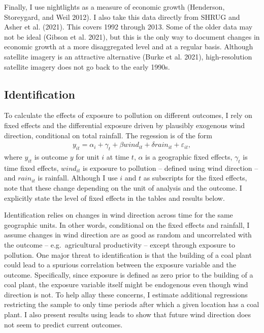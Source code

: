 \documentclass[
]{article}
\begin{document}
Finally, I use nightlights as a measure of economic growth (Henderson, Storeygard, and Weil 2012). I also take this data directly from SHRUG and Asher et al. (2021). This covers 1992 through 2013. Some of the older data may not be ideal (Gibson et al. 2021), but this is the only way to document changes in economic growth at a more disaggregated level and at a regular basis. Although satellite imagery is an attractive alternative (Burke et al. 2021), high-resolution satellite imagery does not go back to the early 1990s.

\hypertarget{identification}{%
\subsection{Identification}\label{identification}}

To calculate the effects of exposure to pollution on different outcomes, I rely on fixed effects and the differential exposure driven by plausibly exogenous wind direction, conditional on total rainfall. The regession is of the form
\begin{gather} y_{it} = \alpha_{i} + \gamma_{t} + \beta wind_{it} + \delta rain_{it} + \varepsilon_{it}, \end{gather}
where \(y_{it}\) is outcome \(y\) for unit \(i\) at time \(t\), \(\alpha\) is a geographic fixed effects, \(\gamma_t\) is time fixed effects, \(wind_{it}\) is exposure to pollution -- defined using wind direction -- and \(rain_{it}\) is rainfall. Although I use \(i\) and \(t\) as subscripts for the fixed effects, note that these change depending on the unit of analysis and the outcome. I explicitly state the level of fixed effects in the tables and results below.

Identification relies on changes in wind direction across time for the same geographic units. In other words, conditional on the fixed effects and rainfall, I assume changes in wind direction are as good as random and uncorrelated with the outcome -- e.g.~agricultural productivity -- except through exposure to pollution. One major threat to identification is that the building of a coal plant could lead to a spurious correlation between the exposure variable and the outcome. Specifically, since exposure is defined as zero prior to the building of a coal plant, the exposure variable itself might be endogenous even though wind direction is not. To help allay these concerns, I estimate additional regressions restricting the sample to only time periods after which a given location has a coal plant. I also present results using leads to show that future wind direction does not seem to predict current outcomes.
\end{document}
